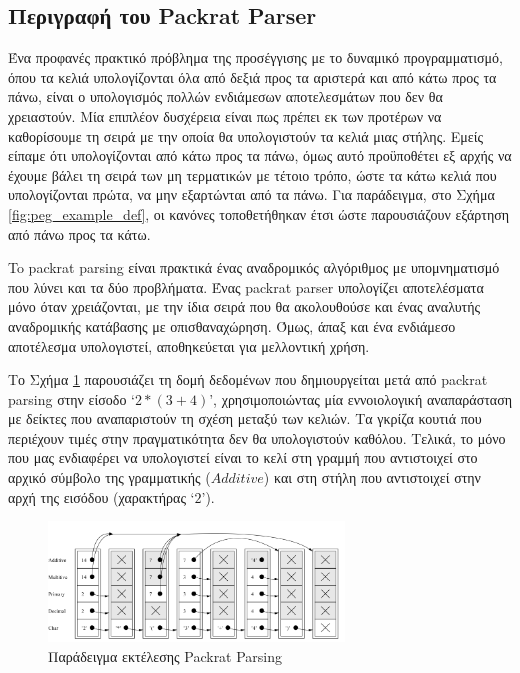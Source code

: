 \subsection{Περιγραφή του Packrat Parser}

Ένα προφανές πρακτικό πρόβλημα της προσέγγισης με το δυναμικό προγραμματισμό, όπου τα κελιά υπολογίζονται όλα από δεξιά προς τα αριστερά και από κάτω προς τα πάνω, είναι ο υπολογισμός πολλών ενδιάμεσων αποτελεσμάτων που δεν θα χρειαστούν. 
Μία επιπλέον δυσχέρεια είναι πως πρέπει εκ των προτέρων να καθορίσουμε τη σειρά με την οποία θα υπολογιστούν τα κελιά μιας στήλης.
Εμείς είπαμε ότι υπολογίζονται από κάτω προς τα πάνω, όμως αυτό προϋποθέτει εξ αρχής να έχουμε βάλει τη σειρά των μη τερματικών με τέτοιο τρόπο, ώστε τα κάτω κελιά που υπολογίζονται πρώτα, να μην εξαρτώνται από τα πάνω.
Για παράδειγμα, στο Σχήμα \ref{fig:peg_example_def}, οι κανόνες τοποθετήθηκαν έτσι ώστε παρουσιάζουν εξάρτηση από πάνω προς τα κάτω.

To packrat parsing είναι πρακτικά ένας αναδρομικός αλγόριθμος με υπομνηματισμό που λύνει και τα δύο προβλήματα.
Ένας packrat parser υπολογίζει αποτελέσματα μόνο όταν χρειάζονται, με την ίδια σειρά που θα ακολουθούσε και ένας αναλυτής αναδρομικής κατάβασης με οπισθαναχώρηση.
Όμως, άπαξ και ένα ενδιάμεσο αποτέλεσμα υπολογιστεί, αποθηκεύεται για μελλοντική χρήση.

Το Σχήμα \ref{fig:packrat_memo_example} παρουσιάζει τη δομή δεδομένων που δημιουργείται μετά από packrat parsing στην είσοδο `$2 * (3 + 4)$', χρησιμοποιώντας μία εννοιολογική αναπαράσταση με δείκτες που αναπαριστούν τη σχέση μεταξύ των κελιών.
Τα γκρίζα κουτιά που περιέχουν τιμές στην πραγματικότητα δεν θα υπολογιστούν καθόλου.
Τελικά, το μόνο που μας ενδιαφέρει να υπολογιστεί είναι το κελί στη γραμμή που αντιστοιχεί στο αρχικό σύμβολο της γραμματικής ($Additive$) και στη στήλη που αντιστοιχεί στην αρχή της εισόδου (χαρακτήρας `$2$').

\begin{figure}[h]
    \centering
	\includegraphics[width=0.70\textwidth]{pics/packrat_memo_example}
	\caption{Παράδειγμα εκτέλεσης Packrat Parsing}
    \label{fig:packrat_memo_example}
\end{figure}

